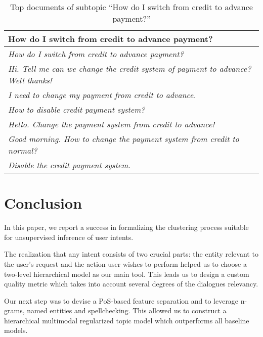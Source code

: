 \begin{table}[!h]
\begin{tabular}{p{7cm}}
  \hline
  \textbf{How do I switch from credit to advance payment?} \\
  \hline
  \textsl{How do I switch from credit to advance payment?} \\
  \textsl{Hi. Tell me can we change the credit system of payment to advance? Well thanks!} \\
  \textsl{I need to change my payment from credit to advance.} \\
  \textsl{How to disable credit payment system?} \\
  \textsl{Hello. Change the payment system from credit to advance!} \\
  \textsl{Good morning. How to change the payment system from credit to normal?} \\
  \textsl{Disable the credit payment system.} \\
  \hline
\end{tabular}
\caption{Top documents of subtopic ``How do I switch from credit to advance payment?''}
\label{subtopic_documents}
\end{table}

\section{Conclusion}
In this paper, we report a success in formalizing the clustering process suitable for unsupervised inference of user intents. 

The realization that any intent consists of two crucial parts: the entity relevant to the user's request and the action user wishes to perform helped us  to choose a two-level hierarchical model as our main tool. This leads us to design a custom quality metric which takes into account several degrees of the dialogues relevancy.

Our next step was to devise a PoS-based feature separation and to leverage n-grams, named entities and spellchecking. This allowed us to construct a hierarchical multimodal regularized topic model which outperforms all baseline models.

